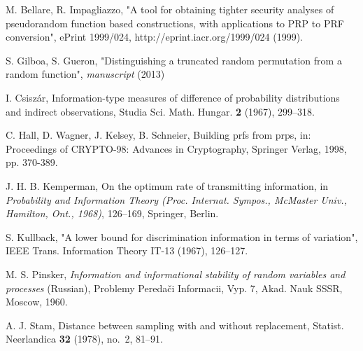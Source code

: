\documentclass{llncs}
\numberwithin{equation}{section}
\numberwithin{lemma}{section}
\numberwithin{proposition}{section}
\begin{document}
\begin{thebibliography}{999999999}

  M. Bellare, R. Impagliazzo, "A tool for obtaining tighter security analyses of pseudorandom function based constructions, with applications to PRP to PRF conversion", ePrint 1999/024, http://eprint.iacr.org/1999/024 (1999).

 S. Gilboa, S. Gueron, "Distinguishing a truncated random permutation from a random function", {\it manuscript} (2013)


I. Csisz\'ar, Information-type measures of difference of probability distributions and indirect observations, Studia Sci. Math. Hungar. {\bf 2} (1967), 299--318.

C. Hall, D. Wagner, J. Kelsey, B. Schneier, Building prfs from prps, in: Proceedings of
CRYPTO-98: Advances in Cryptography, Springer Verlag, 1998, pp. 370-389.

J. H. B. Kemperman, On the optimum rate of transmitting information, in {\it Probability and Information Theory (Proc. Internat. Sympos., McMaster Univ., Hamilton, Ont., 1968)}, 126--169, Springer, Berlin.

S. Kullback, "A lower bound for discrimination information in terms of variation", IEEE Trans. Information Theory IT-13 (1967), 126--127. 

M. S. Pinsker, {\it Information and informational stability of random variables and processes} (Russian), Problemy Pereda\v ci Informacii, Vyp. 7, Akad. Nauk SSSR, Moscow, 1960.

A. J. Stam, Distance between sampling with and without replacement, Statist. Neerlandica {\bf 32} (1978), no.~2, 81--91. 

\end{thebibliography}
\end{document}
